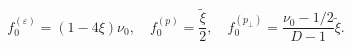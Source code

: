 \begin{equation}\label{fnu0}
  f^{(\varepsilon )}_{0}=(1-4\xi )\nu _0,\quad f^{(p)}_{0}=
 \frac{\tilde \xi }{2},\quad f^{(p_{\perp })}_{0}=\frac{\nu
 _0-1/2}{D-1}\tilde \xi \label{Fq0} .
\end{equation}

